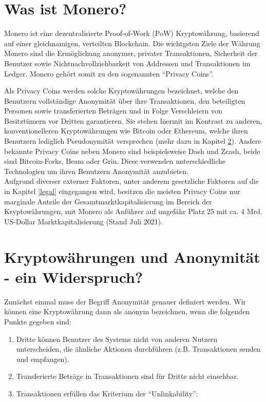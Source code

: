 \chapter{Was ist Monero?}
Monero ist eine dezentralisierte Proof-of-Work (PoW) Kryptowährung, basierend auf einer gleichnamigen, verteilten Blockchain\cite[vgl. Abstract]{Koe2020}.
Die wichtgsten Ziele der Währung Monero sind die Ermöglichung anonymer, privater Transaktionen, Sicherheit der Benutzer sowie Nichtnachvollziehbarkeit von Addressen und Transaktionen im Ledger.
Monero gehört somit zu den sogenannten ``Privacy Coins''.

Als Privacy Coins werden solche Kryptowährungen bezeichnet, welche den Benutzern vollständige Anonymität über ihre Transaktionen, den beteiligten Personen sowie transferierten Beträgen
und in Folge Verschleiern von Besitztümern vor Dritten garantieren.
Sie stehen hiermit im Kontrast zu anderen, konventionelleren Kryptowährungen wie Bitcoin oder Ethereum, welche ihren Benutzern lediglich Pseudonymität versprechen\cite{Vermaak2021} (mehr dazu in Kapitel \ref{anonymity}).
Andere bekannte Privacy Coins neben Monero sind beispielsweise Dash und Zcash, beide sind Bitcoin-Forks, Beam oder Grin. Diese verwenden unterschiedliche Technologien um ihren Benutzern Anonymität anzubieten.\\
Aufgrund diverser externer Faktoren, unter anderem gesetzliche Faktoren auf die in Kapitel \ref{legal} eingegangen wird, besitzen die meisten Privacy Coins nur marginale Anteile der Gesamtmarktkapitalisierung im Bereich der Kryptowährungen, 
mit Monero als Anführer auf ungefähr Platz 25 mit ca. 4 Mrd. US-Dollar Marktkapitalisierung (Stand Juli 2021)\cite{CoinMarketCap2021}.


\chapter{Kryptowährungen und Anonymität - ein Widerspruch?} \label{anonymity}
Zunächst einmal muss der Begriff Anonymität genauer definiert werden. Wir können eine Kryptowährung dann als anonym bezeichnen,
wenn die folgenden Punkte gegeben sind: 
\begin{enumerate}
    \item Dritte können Benutzer des Systems nicht von anderen Nutzern unterscheiden, die ähnliche Aktionen durchführen (z.B. Transaktionen senden und empfangen)\cite{Bleumer2011b}.
    \item Transferierte Beträge in Transaktionen sind für Dritte nicht einsehbar.
    \item Transaktionen erfüllen das Kriterium der ``Unlinkability'': 
\end{enumerate} 

